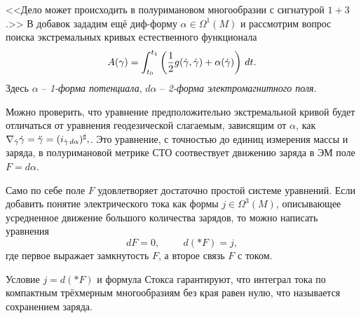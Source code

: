 <<Дело может происходить в полуримановом многообразии с сигнатурой $1+3$.>> В добавок зададим ещё диф-форму $\alpha \in \Omega^1 (M)$ и рассмотрим вопрос поиска экстремальных кривых естественного функционала
\begin{equation*}
    A(\gamma) = \int_{t_0}^{t_1} \left(
        \frac{1}{2} g(\dot{\gamma}, \dot{\gamma}) + \alpha(\dot{\gamma})
    \right) \, d t.
\end{equation*}
Здесь $\alpha$ -- \textit{1-форма потенциала}, $d \alpha$ -- \textit{2-форма электромагнитного поля}.

Можно проверить, что уравнение предположительно экстремальной кривой будет отличаться от уравнения геодезической слагаемым, зависящим от $\alpha$, как $\nabla_{\dot{\gamma}} \dot{\gamma} = \ddot{\gamma} =
    (i_{\dot{\gamma} \, d \alpha})^\sharp,
$.
Это уравнение, с точностью до единиц измерения массы и заряда, в полуримановой метрике СТО соотвествует движению заряда в ЭМ поле $F = d \alpha$.

Само по себе поле $F$ удовлетворяет достаточно простой системе уравнений. Если добавить понятие электрического тока как формы $j \in \Omega^3(M)$, описывающее усредненное движение большого количества зарядов, то можно написать уравнения
\begin{equation*}
    d F = 0, \hspace{1cm} 
    d(*F) = j,
\end{equation*}
где первое выражает замкнутость $F$, а второе связь $F$ с током.

Условие $j = d(*F)$ и формула Стокса гарантируют, что интеграл тока по компактным трёхмерным многообразиям без края равен нулю, что называется сохранением заряда.




